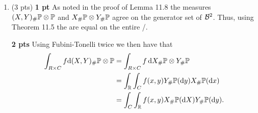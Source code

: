 \begin{enumerate}[label={(\alph*)}]
Thus, the result follows if we can show that 
\[
	[(X,Y)\mathbbm{1}_{\Omega \times B}]_\# \bbP \otimes \bbP = [(X,Y)\circ \Delta \mathbbm{1}_B]_\# \bbP 
\]
as measures on $\cB^2 = \cB \otimes \cB$. 

\textbf{1 pt}
Since both measure are finite it follows from Theorem 2.15 that is suffices to check equality on the generator set $\cB \times \cB$.

\textbf{2 pts}
To this end, let $C, D \in \cB$. Then it holds that
\begin{align*}
	[(X,Y)\circ \Delta \mathbbm{1}_B]^{-1}(C \times D) 
	&= \{\omega \in \Omega \, : \, \omega \in B, X(\omega) \in C, Y(\omega) \in D\}\\
	&= X^{-1}(C) \cap Y^{-1}(D) \cap B.
\end{align*}
Recall that $B \in \sigma(Y)$ so that also $Y^{-1}(D) \cap B \in \sigma(Y)$. Thus, since $X$ and $Y$ are independent
\begin{align*}
	[(X,Y)\circ \Delta \mathbbm{1}_B]_\# \bbP(C \times D) 
	&= \bbP(X^{-1}(C) \cap Y^{-1}(D) \cap B) \\
	&= \bbP(X^{-1}(C)) \bbP(Y^{-1}(D) \cap B).
\end{align*}

\textbf{2 pts}
On the other hand, since
\[
	[(X,Y)\mathbbm{1}_{\Omega \times B}]^{-1}(C \times D) = X^{-1}(C) \times Y^{-1}(D) \cap B,
\]
we have that
\begin{align*}
	[(X,Y)\mathbbm{1}_{\Omega \times B}]_\# \bbP \otimes \bbP(C \times D)
	&= \bbP \otimes \bbP(X^{-1}(C) \times Y^{-1}(D) \cap B) \\
	&= \bbP(X^{-1}(C)) \bbP(Y^{-1}(D) \cap B). 
\end{align*}

We therefore conclude that both measures are equal on the generator set of $\cB^2$ and hence are equal on the entire \sigalg/.
\item (3 pts)
\textbf{1 pt} As noted in the proof of Lemma 11.8 the measures $(X, Y)_\# \mathbb P \otimes \mathbb P$ and $X_\# \mathbb P \otimes Y_\# \mathbb P$ agree on the generator set of $\cB^2$. Thus, using Theorem 11.5 the are equal on the entire \sigalg/. 

\textbf{2 pts} Using Fubini-Tonelli twice we then have that
\begin{align*}
	\int_{R \times C} f \mathrm{d} (X, Y)_\# \mathbb P \otimes \mathbb P 
	&= \int_{R \times C} f \, \mathrm{d} X_\# \mathbb P \otimes Y_\# \mathbb P\\
	&= \int_{\mathbb R} \int_C f(x,y) Y_\# \mathbb P(\mathrm{d} y)  X_\#\mathbb P(\mathrm{d} x) \\
	&= \int_C \int_{\mathbb R} f(x,y) X_\# \mathbb P(\mathrm{d} X) Y_\# \mathbb P(\mathrm{d} y).
\end{align*}

\end{enumerate}



